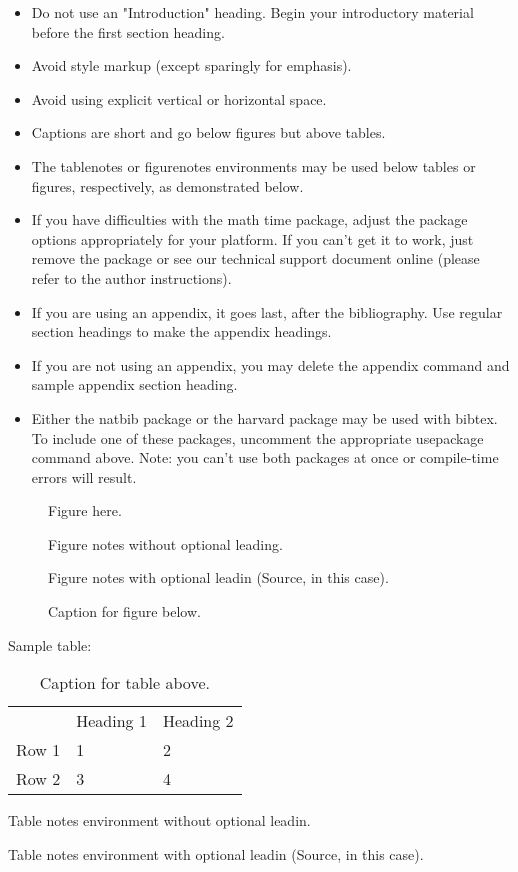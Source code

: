 \begin{itemize}
\item Do not use an "Introduction" heading. Begin your introductory material
before the first section heading.
\item Avoid style markup (except sparingly for emphasis).
\item Avoid using explicit vertical or horizontal space.
\item Captions are short and go below figures but above tables.
\item The tablenotes or figurenotes environments may be used below tables
or figures, respectively, as demonstrated below.
\item If you have difficulties with the math time package, adjust the package
options appropriately for your platform. If you can't get it to work, just
remove the package or see our technical support document online (please
refer to the author instructions).
\item If you are using an appendix, it goes last, after the bibliography.
Use regular section headings to make the appendix headings.
\item If you are not using an appendix, you may delete the appendix command
and sample appendix section heading.
\item Either the natbib package or the harvard package may be used with bibtex.
To include one of these packages, uncomment the appropriate usepackage command
above. Note: you can't use both packages at once or compile-time errors will result.
\end{itemize}




\begin{figure}
Figure here.

\caption{Caption for figure below.}
\begin{figurenotes}
Figure notes without optional leading.
\end{figurenotes}
\begin{figurenotes}[Source]
Figure notes with optional leadin (Source, in this case).
\end{figurenotes}
\end{figure}

Sample table:

\begin{table}
\caption{Caption for table above.}

\begin{tabular}{lll}
& Heading 1 & Heading 2 \\ 
Row 1 & 1 & 2 \\ 
Row 2 & 3 & 4%
\end{tabular}
\begin{tablenotes}
Table notes environment without optional leadin.
\end{tablenotes}
\begin{tablenotes}[Source]
Table notes environment with optional leadin (Source, in this case).
\end{tablenotes}
\end{table}




